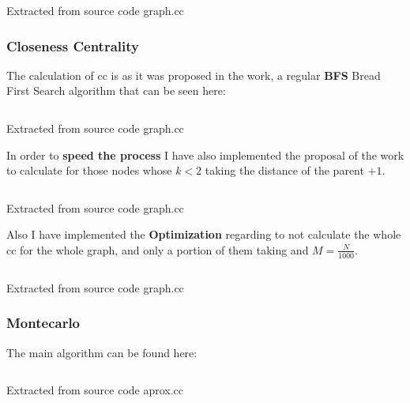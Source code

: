 \documentclass[12pt, a4paper]{article}
\begin{document}
\begin{listing}[H]
    \inputminted[firstline=272, lastline=281, highlightlines={277-279}, breaklines]{cpp}{../src/domain/graph.cc}
    \caption{Extracted from source code graph.cc}
    \label{source:code:2}
\end{listing}  

\subsubsection{Closeness Centrality}
The calculation of \acrshort{cc} is as it was proposed in the work, a regular \textbf{BFS} Bread First Search algorithm 
that can be seen here:

\begin{listing}[H]
    \inputminted[firstline=167, lastline=167, breaklines]{cpp}{../src/domain/graph.cc}
    \caption{Extracted from source code graph.cc}
    \label{source:code:3}
\end{listing} 

In order to \textbf{speed the process} I have also implemented the proposal of the work to calculate for those nodes whose 
$k < 2$ taking the distance of the parent $ + 1$. 

\begin{listing}[H]
    \inputminted[firstline=126, lastline=156, highlightlines={127-132,145-153}, breaklines]{cpp}{../src/domain/graph.cc}
    \caption{Extracted from source code graph.cc}
    \label{source:code:3}
\end{listing} 

Also I have implemented the \textbf{Optimization} regarding to not calculate the whole \acrshort{cc} for the whole graph, and 
only a portion of them taking and $M = \frac{N}{1000}$.

\begin{listing}[H]
    \inputminted[firstline=284, lastline=296, breaklines]{cpp}{../src/domain/graph.cc}
    \caption{Extracted from source code graph.cc}
    \label{source:code:4}
\end{listing} 

\subsubsection{Montecarlo}
The main algorithm can be found here:

\begin{listing}[H]
    \inputminted[firstline=37, lastline=59, breaklines]{cpp}{../src/graph/aprox.cc}
    \caption{Extracted from source code aprox.cc}
    \label{source:code:8}
\end{listing} 
\end{document}
